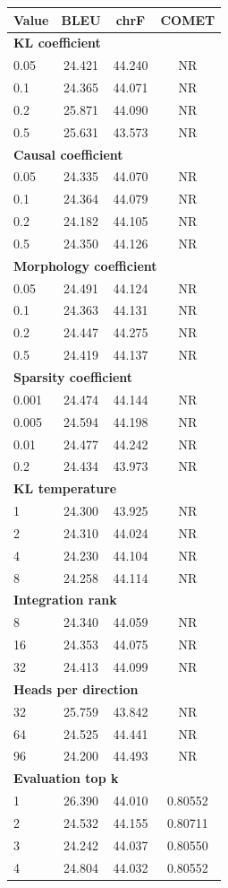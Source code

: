 \begingroup
\fontsize{7}{8.4}\selectfont
\setlength{\tabcolsep}{3pt}
\begin{tabular}{lccc}
\toprule
\textbf{Value} & \textbf{BLEU} & \textbf{chrF} & \textbf{COMET} \\
\midrule
\multicolumn{4}{l}{\textbf{KL coefficient}} \\
0.05 & 24.421 & 44.240 & NR \\
0.1 & 24.365 & 44.071 & NR \\
0.2 & 25.871 & 44.090 & NR \\
0.5 & 25.631 & 43.573 & NR \\
\multicolumn{4}{l}{\textbf{Causal coefficient}} \\
0.05 & 24.335 & 44.070 & NR \\
0.1 & 24.364 & 44.079 & NR \\
0.2 & 24.182 & 44.105 & NR \\
0.5 & 24.350 & 44.126 & NR \\
\multicolumn{4}{l}{\textbf{Morphology coefficient}} \\
0.05 & 24.491 & 44.124 & NR \\
0.1 & 24.363 & 44.131 & NR \\
0.2 & 24.447 & 44.275 & NR \\
0.5 & 24.419 & 44.137 & NR \\
\multicolumn{4}{l}{\textbf{Sparsity coefficient}} \\
0.001 & 24.474 & 44.144 & NR \\
0.005 & 24.594 & 44.198 & NR \\
0.01 & 24.477 & 44.242 & NR \\
0.2 & 24.434 & 43.973 & NR \\
\multicolumn{4}{l}{\textbf{KL temperature}} \\
1 & 24.300 & 43.925 & NR \\
2 & 24.310 & 44.024 & NR \\
4 & 24.230 & 44.104 & NR \\
8 & 24.258 & 44.114 & NR \\
\multicolumn{4}{l}{\textbf{Integration rank}} \\
8 & 24.340 & 44.059 & NR \\
16 & 24.353 & 44.075 & NR \\
32 & 24.413 & 44.099 & NR \\
\multicolumn{4}{l}{\textbf{Heads per direction}} \\
32 & 25.759 & 43.842 & NR \\
64 & 24.525 & 44.441 & NR \\
96 & 24.200 & 44.493 & NR \\
\multicolumn{4}{l}{\textbf{Evaluation top k}} \\
1 & 26.390 & 44.010 & 0.80552 \\
2 & 24.532 & 44.155 & 0.80711 \\
3 & 24.242 & 44.037 & 0.80550 \\
4 & 24.804 & 44.032 & 0.80552 \\
\bottomrule
\end{tabular}
\endgroup
